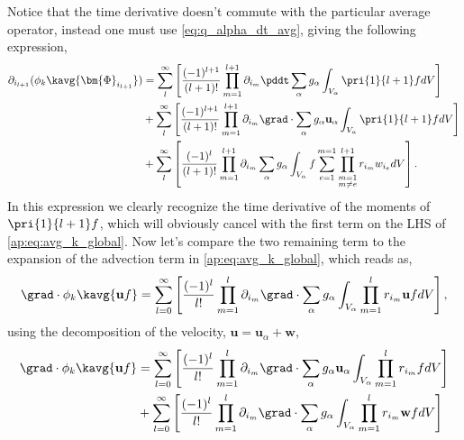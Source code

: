Notice that the time derivative doesn't commute with the particular average operator, instead one must use \ref{eq:q_alpha_dt_avg}, giving the following expression, 
\begin{align}
    \partial_{i_{l+1}}
    (\phi_k \kavg{\bm{\Phi}_{i_{l+1}}})
    & =\sum_l^\infty
    \left[
        \frac{(-1)^{l+1}}{(l+1)!}
        \prod^{l+1}_{m=1}
        \partial_{i_m}
        \pddt
        \sum_{\alpha}
        g_{\alpha} \int_{V_\alpha}
        \pri{1}{l+1}  f dV
    \right]
    \\
    & + \sum_l^\infty
    \left[
        \frac{(-1)^{l+1}}{(l+1)!}
        \prod^{l+1}_{m=1}
        \partial_{i_m}
        \grad \cdot
        \sum_{\alpha}
        g_{\alpha} \textbf{u}_\alpha 
        \int_{V_\alpha}
        \pri{1}{l+1}  f  dV
        \right]\\
        &+\sum_l^\infty
    \left[
        \frac{(-1)^{l}}{(l+1)!}
        \prod^{l+1}_{m=1}
        \partial_{i_m}
        \sum_{\alpha}
        g_{\alpha}\int_{V_\alpha}
        f\sum_{e=1}^{m=1} 
        \prod^{l+1}_{\substack{m=1\\ m\neq e}} 
        r_{i_m} 
        w_{i_e}
        dV
    \right].
    \label{ap:eq:partial_Phi}
\end{align}
In this expression we clearly recognize the time derivative of the moments of $\pri{1}{l+1}f$, which will obviously cancel with the first term on the LHS of \ref{ap:eq:avg_k_global}.
Now let's compare the two remaining term to the expansion of the advection term in \ref{ap:eq:avg_k_global}, which reads as, 
\begin{equation}
    \grad \cdot \phi_k \kavg{\textbf{u} f}
    = \sum_{l=0}^\infty  
    \left[
        \frac{(-1)^l}{l!} \prod^{l}_{m=1}\partial_{i_m}
        \grad \cdot
        \sum_\alpha  g_\alpha \int_{V_\alpha} \prod^l_{m=1}r_{i_m} \textbf{u} f dV
    \right],
\end{equation}
using the decomposition of the velocity, $\textbf{u} = \textbf{u}_\alpha + \textbf{w}$, 
\begin{align}
    \grad \cdot \phi_k \kavg{\textbf{u} f}
    &= \sum_{l=0}^\infty  
    \left[
        \frac{(-1)^l}{l!} \prod^{l}_{m=1}\partial_{i_m}
        \grad \cdot
        \sum_\alpha  g_\alpha \textbf{u}_\alpha  \int_{V_\alpha} \prod^l_{m=1}r_{i_m} f dV
    \right]\\
    &+ \sum_{l=0}^\infty  
    \left[
        \frac{(-1)^l}{l!} \prod^{l}_{m=1}\partial_{i_m}
        \grad \cdot
        \sum_\alpha  g_\alpha \int_{V_\alpha} \prod^l_{m=1}r_{i_m} \textbf{w} f dV
    \right]
    \label{ap:eq:partial_uf}
\end{align}
